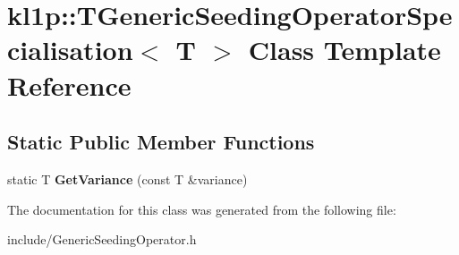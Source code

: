 \hypertarget{classkl1p_1_1TGenericSeedingOperatorSpecialisation}{}\section{kl1p\+:\+:T\+Generic\+Seeding\+Operator\+Specialisation$<$ T $>$ Class Template Reference}
\label{classkl1p_1_1TGenericSeedingOperatorSpecialisation}
\subsection*{Static Public Member Functions}
\begin{DoxyCompactItemize}
\item 
static T {\bfseries Get\+Variance} (const T \&variance)\hypertarget{classkl1p_1_1TGenericSeedingOperatorSpecialisation_a2d58837b2e541ed8c4b7d5fe73c43b8b}{}\label{classkl1p_1_1TGenericSeedingOperatorSpecialisation_a2d58837b2e541ed8c4b7d5fe73c43b8b}

\end{DoxyCompactItemize}


The documentation for this class was generated from the following file\+:\begin{DoxyCompactItemize}
\item 
include/Generic\+Seeding\+Operator.\+h\end{DoxyCompactItemize}
